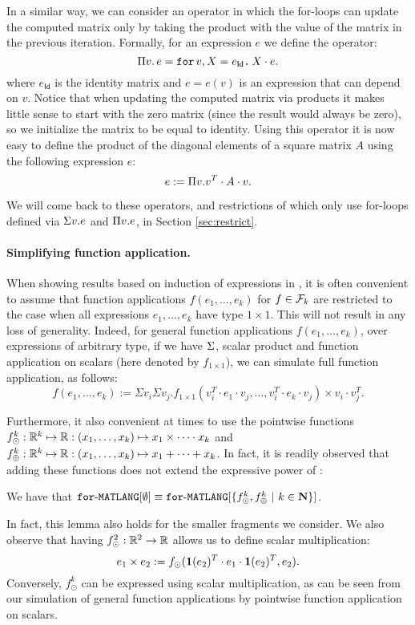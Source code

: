 
In a similar way, we can consider an operator in which the for-loops can update the computed matrix only by taking the product with the value of the matrix in the previous iteration. Formally, for an expression $e$ we define the operator:
$$
\Pi v.\,  e=\texttt{for}\, v,X = e_{\mathsf{Id}} \texttt{.}\, X\cdot e.
$$
where $e_{\mathsf{Id}}$ is the identity matrix and $e=e(v)$ is an expression that can depend on $v$. Notice that when updating the computed matrix via products it makes little sense to start with the zero matrix (since the result would always be zero), so we initialize the matrix to be equal to identity. 
Using this operator it is now easy to define the product of the diagonal elements of a square matrix $A$ using the following expression $e$:
$$
e := \Pi v. v^T\cdot A \cdot v.
$$

We will come back to these operators, and restrictions of \langfor which only use for-loops defined via $\Sigma v.e$ and $\Pi v.e$, in Section \ref{sec:restrict}.

\paragraph{Simplifying function application.} When showing results based on induction of expressions in \langfor, it is often convenient to assume that function applications $f(e_1,\ldots,e_k)$ for $f\in\mathcal{F}_k$ are restricted to
the case when all expressions $e_1,\ldots,e_k$ have type $1\times 1$. This will not result in any loss of generality. Indeed,
for general function applications $f(e_1,\ldots,e_k)$, over expressions of arbitrary type, if we have $\Sigma$, scalar product and function application on scalars (here denoted by $f_{1\times 1}$), we can simulate full function application, as follows:
 $$
f(e_1,\ldots, e_k) :=\Sigma v_i \Sigma v_j. f_{1\times 1}(v_i^T\cdot e_1\cdot v_j, \ldots ,v_i^T\cdot e_k\cdot v_j) \times v_i\cdot v_j^T.
$$

Furthermore, it also convenient at times to use the pointwise functions
$f_\odot^k:\mathbb{R}^k\mapsto \mathbb{R}:(x_1,\ldots,x_k)\mapsto x_1\times\cdots \cdot x_k$ and 
$f_\oplus^k:\mathbb{R}^k\mapsto \mathbb{R}:(x_1,\ldots,x_k)\mapsto x_1+\cdots + x_k$. In fact, it is readily observed that adding these functions does not extend the expressive power of \langfor:
\begin{lemma}
\label{lm-prod-sum}
We have that $\texttt{for}\text{-}\texttt{MATLANG}[\emptyset] \equiv \texttt{for}\text{-}\texttt{MATLANG}[\{f_\odot^k,f_\oplus^k \ | \ k\in \mathbf{N}\}]$.
\end{lemma}
In fact, this lemma also holds for the smaller fragments we consider.
%
We also observe that having $f_\odot^2:\mathbb{R}^2\to\mathbb{R}$ allows us to define scalar multiplication:
$$
e_1\times e_2 :=f_{\odot}(\mathbf{1}(e_2)^T\cdot e_1 \cdot \mathbf{1}(e_2)^T, e_2).
$$
Conversely, $f_\odot^k$ can be expressed using scalar multiplication, as can be seen from our simulation of general function applications by pointwise function application on scalars.

